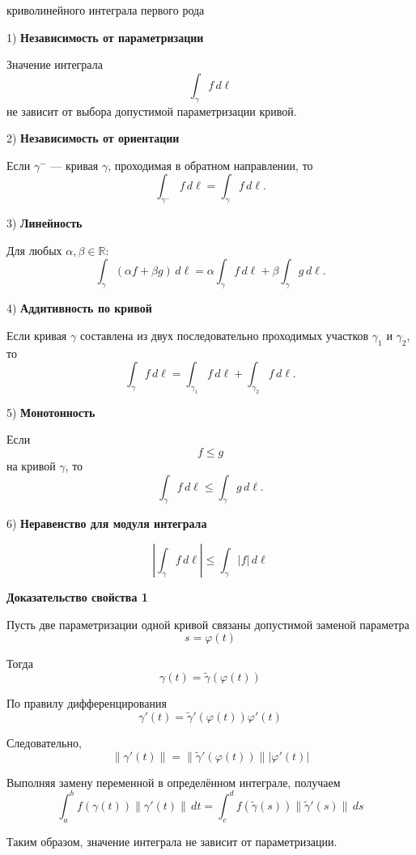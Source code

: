 \documentclass[12pt,a4paper]{article}
\begin{document}
\begin{props}{криволинейного интеграла первого рода}

1) \textbf{Независимость от параметризации}

Значение интеграла
\[
\int_\gamma f\,d\ell
\]
не зависит от выбора допустимой параметризации кривой.

2) \textbf{Независимость от ориентации}

Если $\gamma^{-}$ — кривая $\gamma$, проходимая в обратном направлении, то
\[
\int_{\gamma^{-}}f\,d\ell
=
\int_\gamma f\,d\ell.
\]

3) \textbf{Линейность}

Для любых $\alpha,\beta\in\mathbb{R}$:
\[
\int_\gamma(\alpha f+\beta g)\,d\ell
=
\alpha\int_\gamma f\,d\ell
+
\beta\int_\gamma g\,d\ell.
\]

4) \textbf{Аддитивность по кривой}

Если кривая $\gamma$ составлена из двух последовательно проходимых участков $\gamma_1$ и $\gamma_2$, то
\[
\int_\gamma f\,d\ell
=
\int_{\gamma_1}f\,d\ell
+
\int_{\gamma_2}f\,d\ell.
\]

5) \textbf{Монотонность}

Если
\[
f\leq g
\]
на кривой $\gamma$, то
\[
\int_\gamma f\,d\ell
\leq
\int_\gamma g\,d\ell.
\]

6) \textbf{Неравенство для модуля интеграла}

\[
\left|\int_\gamma f\,d\ell\right|
\leq
\int_\gamma|f|\,d\ell
\]

\end{props}

\textbf{Доказательство свойства 1}

\begin{proofbox}
Пусть две параметризации одной кривой связаны допустимой заменой параметра
\[
s=\varphi(t)
\]

Тогда
\[
\gamma(t)=\widetilde{\gamma}(\varphi(t))
\]

По правилу дифференцирования
\[
\gamma'(t)
=
\widetilde{\gamma}'(\varphi(t))\varphi'(t)
\]

Следовательно,
\[
\|\gamma'(t)\|
=
\|\widetilde{\gamma}'(\varphi(t))\|
|\varphi'(t)|
\]

Выполняя замену переменной в определённом интеграле, получаем
\[
\int_a^b f(\gamma(t))\|\gamma'(t)\|\,dt
=
\int_c^d
f(\widetilde{\gamma}(s))
\|\widetilde{\gamma}'(s)\|\,ds
\]

Таким образом, значение интеграла не зависит от параметризации.
\end{proofbox}
\end{document}
